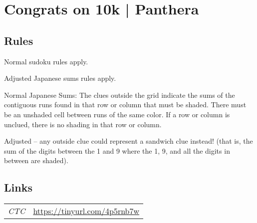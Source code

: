 \section[Congrats on 10k | Panthera {[\emph{JSS/Sandwich}]}]{Congrats on 10k | {\normalfont Panthera}}
\label{sec:52-congrats-on-10k-panthera}

\subsection*{Rules}
\begin{markdown}
Normal sudoku rules apply.

Adjusted Japanese sums rules apply.



Normal Japanese Sums: The clues outside the grid indicate the sums of the contiguous runs found in that row or column that must be shaded. There must be an unshaded cell between runs of the same color. If a row or column is unclued, there is no shading in that row or column.



Adjusted -- any outside clue could represent a sandwich clue instead! (that is, the sum of the digits between the 1 and 9 where the 1, 9, and all the digits in between are shaded). 
\end{markdown}
\subsection*{Links}
\begin{tabularx}{\textwidth}{l X}
\emph{CTC} & \url{https://tinyurl.com/4p5rnb7w} \\
\end{tabularx}
\pagebreak
